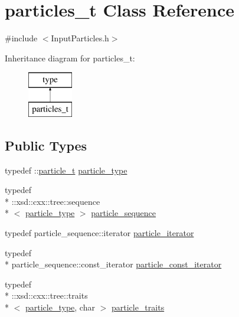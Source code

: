 \hypertarget{classparticles__t}{\section{particles\-\_\-t Class Reference}
\label{classparticles__t}
}


{\ttfamily \#include $<$Input\-Particles.\-h$>$}

Inheritance diagram for particles\-\_\-t\-:\begin{figure}[H]
\begin{center}
\leavevmode
\includegraphics[height=2.000000cm]{classparticles__t}
\end{center}
\end{figure}
\subsection*{Public Types}
\begin{DoxyCompactItemize}
\item 
typedef \-::\hyperlink{classparticle__t}{particle\-\_\-t} \hyperlink{classparticles__t_af3204fae99711ad2c2e8fc73334219ef}{particle\-\_\-type}
\item 
typedef \\*
\-::xsd\-::cxx\-::tree\-::sequence\\*
$<$ \hyperlink{classparticles__t_af3204fae99711ad2c2e8fc73334219ef}{particle\-\_\-type} $>$ \hyperlink{classparticles__t_a372e39e275f0ebfb91ac53eacdb4a1f2}{particle\-\_\-sequence}
\item 
typedef particle\-\_\-sequence\-::iterator \hyperlink{classparticles__t_a876677de456e8144f2b0c51172d9dc0a}{particle\-\_\-iterator}
\item 
typedef \\*
particle\-\_\-sequence\-::const\-\_\-iterator \hyperlink{classparticles__t_a2380817b2b2e9911b8c7853d8f075ad3}{particle\-\_\-const\-\_\-iterator}
\item 
typedef \\*
\-::xsd\-::cxx\-::tree\-::traits\\*
$<$ \hyperlink{classparticles__t_af3204fae99711ad2c2e8fc73334219ef}{particle\-\_\-type}, char $>$ \hyperlink{classparticles__t_adf7984716150a259981b7f262344ee9a}{particle\-\_\-traits}
\end{DoxyCompactItemize}
